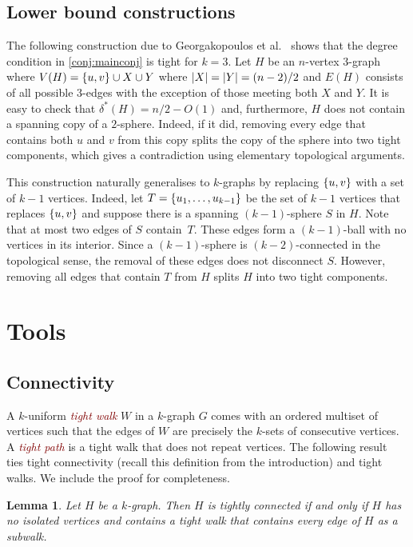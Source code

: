 \documentclass[12pt,reqno]{amsart}
\theoremstyle{plain}
\newtheorem{lemma}[theorem]{Lemma}
\theoremstyle{definition}
\numberwithin{equation}{section}
\DeclarePairedDelimiter{\abs}{\lvert}{\rvert}
\DeclarePairedDelimiter{\set}{\{}{\}}
\newcommand{\defn}[1]{\textcolor{Maroon}{\emph{#1}}}
\newcommand{\comin}{\delta^{\ast}}
\begin{document}
	\subsection{Lower bound constructions}\label{sec:constructions}
	
	The following construction due to Georgakopoulos et al.~\cite{georgakopoulos2022spanning} shows that the degree condition in \cref{conj:mainconj} is tight for $k=3$.
	Let $H$ be an $n$-vertex $3$-graph where $V(H) = \set{u,v}\cup X \cup Y$ where $\abs{X} = \abs{Y} = (n-2)/2$ and $E(H)$ consists of all possible $3$-edges with the exception of those meeting both $X$ and $Y$. It is easy to check that $\comin(H) = n/2-O(1)$ and, furthermore, $H$ does not contain a spanning copy of a $2$-sphere. Indeed, if it did, removing every edge that contains both $u$ and $v$ from this copy splits the copy of the sphere into two tight components, which gives a contradiction using elementary topological arguments.
	
	This construction naturally generalises to $k$-graphs by replacing $\set{u,v}$ with a set of $k - 1$ vertices.
	{Indeed, let $T = \set{u_1, \dotsc, u_{k - 1}}$ be the set of $k - 1$ vertices that replaces $\set{u, v}$ and suppose there is a spanning $(k - 1)$-sphere $S$ in $H$. Note that at most two edges of $S$ contain~$T$. These edges form a $(k - 1)$-ball with no vertices in its interior. Since a $(k - 1)$-sphere is $(k - 2)$-connected in the topological sense, the removal of these edges does not disconnect $S$. However, removing all edges that contain $T$ from $H$ splits $H$ into two tight components.}
	
	\section{Tools}\label{sec:tools}
	
	\subsection{Connectivity}
	
	A $k$-uniform \defn{tight walk} $W$ in a $k$-graph $G$ comes with an ordered multiset of vertices such that the edges of $W$ are precisely the $k$-sets of consecutive vertices. A \defn{tight path} is a tight walk that does not repeat vertices.
	The following result~\cite[Prop.~5.1]{LS23} ties tight connectivity (recall this definition from the introduction) and tight walks. We include the proof for completeness.
	
	\begin{lemma}\label{lem:tight-connectivity-walk}
		Let $H$ be a $k$-graph. Then $H$ is tightly connected if and only if $H$ has no isolated vertices and contains a tight walk that contains every edge of $H$ as a subwalk.
	\end{lemma}
	
\end{document}
